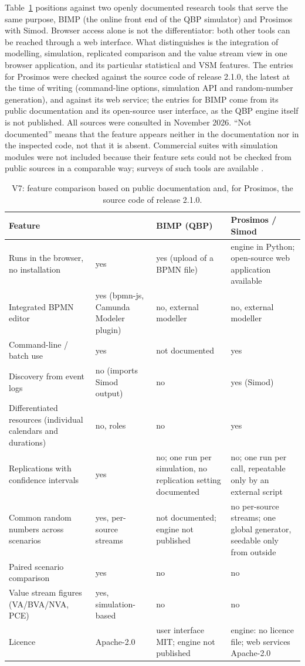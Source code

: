 Table~\ref{tab:v7} positions \tool{} against two openly documented research tools that serve the same purpose, BIMP (the online front end of the QBP simulator) and Prosimos with Simod. Browser access alone is not the differentiator: both other tools can be reached through a web interface. What distinguishes \tool{} is the integration of modelling, simulation, replicated comparison and the value stream view in one browser application, and its particular statistical and VSM features. The entries for Prosimos were checked against the source code of release 2.1.0, the latest at the time of writing (command-line options, simulation API and random-number generation), and against its web service; the entries for BIMP come from its public documentation and its open-source user interface, as the QBP engine itself is not published. All sources were consulted in November 2026. ``Not documented'' means that the feature appears neither in the documentation nor in the inspected code, not that it is absent. Commercial suites with simulation modules were not included because their feature sets could not be checked from public sources in a comparable way; surveys of such tools are available \citep{pereira2016,rosenthal2021}.

\begin{table}[!htbp]
\centering\small
\caption{V7: feature comparison based on public documentation and, for Prosimos, the source code of release 2.1.0.}
\label{tab:v7}
\scriptsize
\begin{tabularx}{\linewidth}{@{}>{\raggedright\arraybackslash}p{3.3cm}*{3}{>{\raggedright\arraybackslash}X}@{}}
\toprule
Feature & \tool{} & BIMP (QBP) & Prosimos / Simod \\
\midrule
Runs in the browser, no installation & yes & yes (upload of a BPMN file) & engine in Python; open-source web application available \\
Integrated BPMN editor & yes (bpmn-js, Camunda Modeler plugin) & no, external modeller & no, external modeller \\
Command-line / batch use & yes & not documented & yes \\
Discovery from event logs & no (imports Simod output) & no & yes (Simod) \citep{camargo2020} \\
Differentiated resources (individual calendars and durations) & no, roles & no & yes \citep{lopezpintado2022} \\
Replications with confidence intervals & yes & no; one run per simulation, no replication setting documented & no; one run per call, repeatable only by an external script \\
Common random numbers across scenarios & yes, per-source streams & not documented; engine not published & no per-source streams; one global generator, seedable only from outside \\
Paired scenario comparison & yes & no & no \\
Value stream figures (VA/BVA/NVA, PCE) & yes, simulation-based & no & no \\
Licence & Apache-2.0 & user interface MIT; engine not published & engine: no licence file; web services Apache-2.0 \\
\bottomrule
\end{tabularx}
\end{table}
